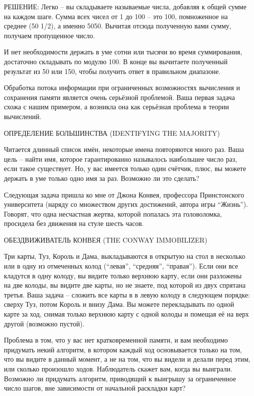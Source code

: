 РЕШЕНИЕ: Легко -- вы складываете называемые числа, добавляя к общей сумме на каждом шаге. Сумма всех чисел от 1 до 100 -- это 100, помноженное на среднее (50 1/2), а именно 5050. Вычитая отсюда полученную вами сумму, получаем пропущенное число.

И нет необходимости держать в уме сотни или тысячи во время суммирования, достаточно складывать по модулю 100. В конце вы вычитаете полученный результат из 50 или 150, чтобы получить ответ в правильном диапазоне.

Обработка потока информации при ограниченных возможностях вычисления и сохранения памяти является очень серьёзной проблемой. Ваша первая задача схожа с нашим примером, а возникла она как серьёзная проблема в теории вычислений.

ОПРЕДЕЛЕНИЕ БОЛЬШИНСТВА (IDENTIFYING THE MAJORITY)

Читается длинный список имён, некоторые имена повторяются много раз. Ваша цель -- найти имя, которое гарантированно называлось наибольшее число раз, если такое существует. 
Но, у вас имеется только один счётчик, плюс, вы можете держать в уме только одно имя за раз. Возможно ли это сделать?

Следующая задача пришла ко мне от Джона Конвея, профессора Принстонского университета (наряду со множеством других достижений, автора игры “Жизнь”). Говорят, что одна несчастная жертва, которой попалась эта головоломка, просидела без движения на стуле шесть часов.

ОБЕЗДВИЖИВАТЕЛЬ КОНВЕЯ (THE CONWAY IMMOBILIZER)

Три карты, Туз, Король и Дама, выкладываются в открытую на стол в несколько или в одну из отмеченных колод (“левая”, “средняя”, “правая”). Если они все кладутся в одну колоду, вы видите только верхнюю карту, если они разложены на две колоды, вы видите две карты, но не знаете, под которой из двух спрятана третья.
Ваша задача -- сложить все карты в в левую колоду в следующем порядке: сверху Туз, потом Король и внизу Дама. Вы можете перекладывать по одной карте за ход, снимая только верхнюю карту с одной колоды и помещая её на верх другой (возможно пустой). 

Проблема в том, что у вас нет кратковременной памяти, и вам необходимо придумать некий алгоритм, в котором каждый ход основывается только на том, что вы видите в данный момент, а не на том, что вы видели и делали перед этим, или сколько произошло ходов. Наблюдатель скажет вам, когда вы выиграли. Возможно ли придумать алгоритм, приводящий к выигрышу за ограниченное число шагов, вне зависимости от начальной раскладки карт?


